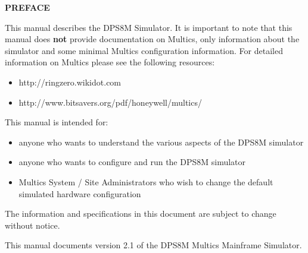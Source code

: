 
\begin{center}
\Large\bfseries PREFACE
\end{center}

This manual describes the DPS8M Simulator. It is important to note that this manual
does \textbf{not} provide documentation on Multics, only information about the simulator and some minimal Multics configuration information.
For detailed information on Multics please see the following resources:

\begin{itemize}
	\item http://ringzero.wikidot.com
	\item http://www.bitsavers.org/pdf/honeywell/multics/
\end{itemize}

This manual is intended for:

\begin{itemize}
	\item anyone who wants to understand the various aspects of the DPS8M simulator
	\item anyone who wants to configure and run the DPS8M simulator
	\item Multics System / Site Administrators who wish to change the default simulated hardware configuration
\end{itemize}

The information and specifications in this document are subject to change without notice.

This manual documents version 2.1 of the DPS8M Multics Mainframe Simulator.

